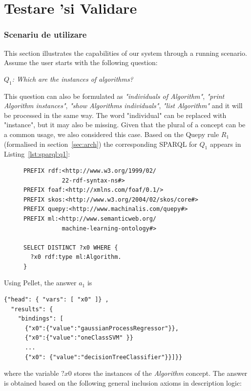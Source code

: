 \documentclass[12pt,a4paper,twoside]{report}
\begin{document}
\chapter{Testare 'si Validare}
\subsection{Scenariu de utilizare}
This section illustrates the capabilities of our system through a running scenario. 
Assume the user starts with the following question:

\begin{center}
{\it $Q_1$: Which are the instances of algorithms?}
\end{center}

This question can also be formulated as {\it"individuals of Algorithm"},
       {\it "print Algorithm instances"},
       {\it "show Algorithms individuals"},
        {\it"list Algorithm"} and it will be processed in the same way. 
The word "individual" can be replaced with "instance", but it may also be missing. Given that the plural of a concept can be a common usage, we also considered this case.
Based on the Quepy rule $R_1$ (formalised in section~\ref{sec:arch}) the corresponding SPARQL for $Q_1$ appears in Listing~\ref{lst:sparql:q1}:

\begin{figure}[h]
\begin{footnotesize}
\begin{lstlisting}[captionpos=b, caption=SPARQL formalisation for the query $Q_1$., label=lst:sparql:q1,
   basicstyle=\ttfamily,frame=single]
PREFIX rdf:<http://www.w3.org/1999/02/
           22-rdf-syntax-ns#>
PREFIX foaf:<http://xmlns.com/foaf/0.1/>
PREFIX skos:<http://www.w3.org/2004/02/skos/core#>
PREFIX quepy:<http://www.machinalis.com/quepy#>
PREFIX ml:<http://www.semanticweb.org/
           machine-learning-ontology#>

SELECT DISTINCT ?x0 WHERE {
  ?x0 rdf:type ml:Algorithm.
}
\end{lstlisting}
\end{footnotesize}
\end{figure}

Using Pellet, the answer $a_1$ is

\begin{center}
\begin{lstlisting}[basicstyle=\footnotesize]
{"head": { "vars": [ "x0" ]} ,
  "results": {
    "bindings": [
      {"x0":{"value":"gaussianProcessRegressor"}},
      {"x0":{"value":"oneClassSVM" }} 
      ...
      {"x0": {"value":"decisionTreeClassifier"}}]}}
\end{lstlisting}
\end{center}
where the variable $?x0$ stores the instances of the  {\it Algorithm} concept. 
The answer is obtained based on the following general inclusion axioms in description logic:
\end{document}
